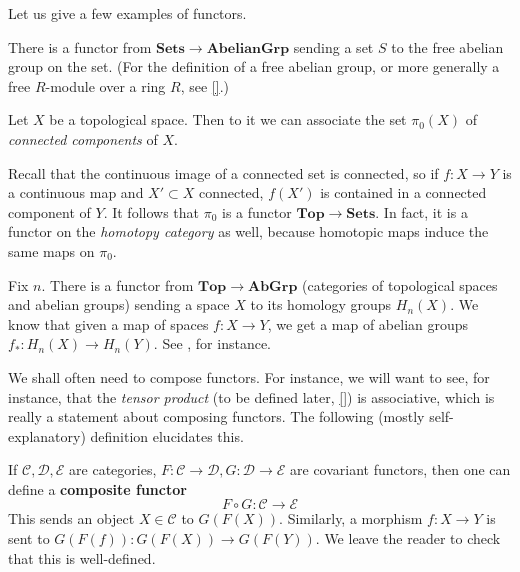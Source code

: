 Let us give a few examples of functors.

\begin{example}
There is a functor from $\mathbf{Sets} \to \mathbf{AbelianGrp}$ sending a set
$S$ to the free abelian group on the set. (For the definition of a free abelian
group, or more generally a free $R$-module over a ring $R$, see \cref{}.)
\end{example}

\begin{example} \label{pi0}
Let $X$ be a topological space. Then to it we can associate the set $\pi_0(X)$
of \emph{connected components} of $X$. 

Recall that the continuous image of a
connected set is connected, so if $f: X \to Y$ is a continuous map and $X'
\subset X$ connected, $f(X')$ is contained in a connected component of $Y$. It
follows that $\pi_0$ is a functor $\mathbf{Top} \to \mathbf{Sets}$.
In fact, it is a functor on the \emph{homotopy category} as well, because
homotopic maps induce the same maps on $\pi_0$.
\end{example} 


\begin{example}
Fix $n$.
There is a functor from $\mathbf{Top} \to \mathbf{AbGrp}$
(categories of topological spaces and abelian groups) sending a
space $X$ to its homology groups $H_n(X)$. We know that given a map of spaces
$f: X \to Y$,
we get a map of abelian groups $f_*: H_n(X) \to H_n(Y)$. See \cite{Ha02}, for
instance.
\end{example}

We shall often need to compose functors. For instance, we will want to see, for
instance, that the \emph{tensor product} (to be defined later, \cref{}) is
associative, which is really a statement about composing functors. The
following (mostly self-explanatory) definition elucidates this.

\begin{definition}\label{composefunctors}
If $\mathcal{C}, \mathcal{D}, \mathcal{E}$ are categories, $F: \mathcal{C} \to
\mathcal{D}, G: \mathcal{D} \to \mathcal{E}$ are covariant functors, then one
can define a \textbf{composite functor}
\[ F \circ G: \mathcal{C}  \to \mathcal{E}  \]
This sends an object $X \in \mathcal{C}$ to $G(F(X))$.
Similarly, a morphism $f :X \to Y$ is sent to $G(F(f)): G(F(X)) \to G(F(Y))$.
We leave the reader to check that this is well-defined.
\end{definition}




